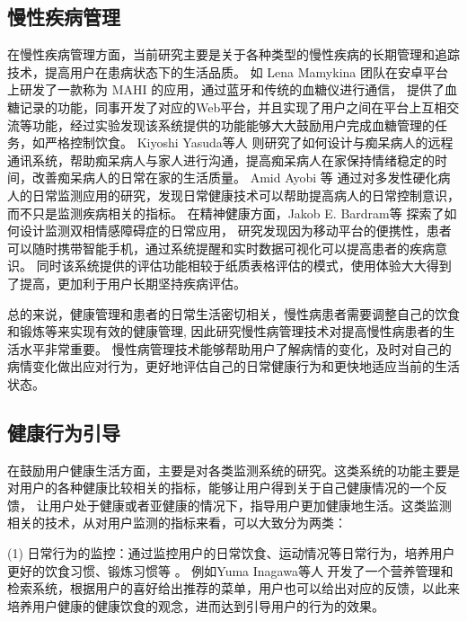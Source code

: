 \subsection{慢性疾病管理}
在慢性疾病管理方面，当前研究主要是关于各种类型的慢性疾病的长期管理和追踪技术，提高用户在患病状态下的生活品质。
如 Lena Mamykina \cite{mamykina2008mahi:}团队在安卓平台上研发了一款称为 MAHI 的应用，通过蓝牙和传统的血糖仪进行通信，
提供了血糖记录的功能，同事开发了对应的Web平台，并且实现了用户之间在平台上互相交流等功能，经过实验发现该系统提供的功能能够大大鼓励用户完成血糖管理的任务，如严格控制饮食。
Kiyoshi Yasuda等人 \cite{yasuda2009remote}则研究了如何设计与痴呆病人的远程通讯系统，帮助痴呆病人与家人进行沟通，提高痴呆病人在家保持情绪稳定的时间，改善痴呆病人的日常在家的生活质量。
Amid Ayobi 等\cite{ayobi2017quantifying} 通过对多发性硬化病人的日常监测应用的研究，发现日常健康技术可以帮助提高病人的日常控制意识，而不只是监测疾病相关的指标。
在精神健康方面，Jakob E. Bardram等 \cite{bardram2013designing}探索了如何设计监测双相情感障碍症的日常应用， 研究发现因为移动平台的便携性，患者可以随时携带智能手机，通过系统提醒和实时数据可视化可以提高患者的疾病意识。
同时该系统提供的评估功能相较于纸质表格评估的模式，使用体验大大得到了提高，更加利于用户长期坚持疾病评估。

总的来说，健康管理和患者的日常生活密切相关，慢性病患者需要调整自己的饮食和锻炼等来实现有效的健康管理\cite{nunes2018understanding}, 因此研究慢性病管理技术对提高慢性病患者的生活水平非常重要。
慢性病管理技术能够帮助用户了解病情的变化，及时对自己的病情变化做出应对行为，更好地评估自己的日常健康行为和更快地适应当前的生活状态\cite{ayobi2017quantifying}。


\subsection{健康行为引导}
在鼓励用户健康生活方面，主要是对各类监测系统的研究。这类系统的功能主要是对用户的各种健康比较相关的指标，能够让用户得到关于自己健康情况的一个反馈，
让用户处于健康或者亚健康的情况下，指导用户更加健康地生活。这类监测相关的技术，从对用户监测的指标来看，可以大致分为两类：

(1) 日常行为的监控：通过监控用户的日常饮食、运动情况等日常行为，培养用户更好的饮食习惯、锻炼习惯等 \cite{purpura2011fit4life} \cite{Inagawa2013A} \cite{bravata2007using} \cite{cordeiro2015barriers} \cite{lin2006fish} \cite{miller2014stepstream}。 例如Yuma Inagawa等人  \cite{Inagawa2013A} 开发了一个营养管理和检索系统，根据用户的喜好给出推荐的菜单，用户也可以给出对应的反馈，以此来培养用户健康的健康饮食的观念，进而达到引导用户的行为的效果。


